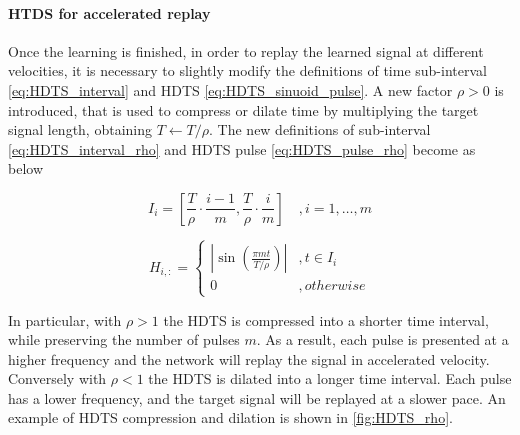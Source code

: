 \documentclass[10pt,a4paper, final]{report} %
\begin{document}
\paragraph{HTDS for accelerated replay}
Once the learning is finished, in order to replay the learned signal at different velocities, it is necessary to slightly modify the definitions of time sub-interval \eqref{eq:HDTS_interval} and HDTS \eqref{eq:HDTS_sinuoid_pulse}. A new factor $\rho > 0$ is introduced, that is used to compress or dilate time by multiplying the target signal length, obtaining $T \leftarrow T / \rho$. The new definitions of sub-interval \eqref{eq:HDTS_interval_rho} and HDTS pulse \eqref{eq:HDTS_pulse_rho} become as below

\begin{equation}
I_i = [\frac{T}{\rho} \cdot \frac{i-1}{m}, \frac{T}{\rho} \cdot \frac{i}{m}] \quad , i=1, \ldots, m
\label{eq:HDTS_interval_rho}
\end{equation}

\begin{equation}
H_{i,:} = 
\begin{cases}
| \sin(\frac{\pi m t}{T/ \rho}) | &, t \in I_i\\
0 &, otherwise
\end{cases}
\label{eq:HDTS_pulse_rho}
\end{equation}

In particular, with $\rho > 1$ the HDTS is compressed into a shorter time interval, while preserving the number of pulses $m$. As a result, each pulse is presented at a higher frequency and the network will replay the signal in accelerated velocity. Conversely with $\rho < 1$ the HDTS is dilated into a longer time interval. Each pulse has a lower frequency, and the target signal will be replayed at a slower pace.
An example of HDTS compression and dilation is shown in \autoref{fig:HDTS_rho}.
\end{document}
